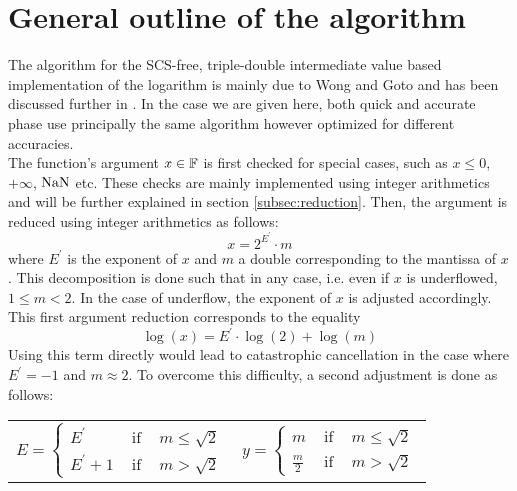 
\section{General outline of the algorithm\label{sec:outline}}
The algorithm for the SCS-free, triple-double intermediate value based implementation of the logarithm is mainly due to 
Wong and Goto\cite{WG94} and has been discussed further in \cite{Muller97}. In the case we are given here,
both quick and accurate phase use principally the same algorithm however optimized for different accuracies.\\
The function's argument $x \in \mathbb {F}$ is first checked for special cases, such as $x\leq0$, $+\infty$, $\mathrm{NaN}$ etc.
These checks are mainly implemented using integer arithmetics and will be further explained in section
\ref{subsec:reduction}. Then, the argument is reduced using integer arithmetics as follows:
$$x = 2^{E^\prime} \cdot m$$
where $E^\prime$ is the exponent of $x$ and $m$ a double corresponding to the mantissa of $x$. This 
decomposition is done such that in any case, i.e. even if $x$ is underflowed, $1 \leq m < 2$. In the case
of underflow, the exponent of $x$ is adjusted accordingly.
This first argument reduction corresponds to the equality
$$\log\left( x \right) = E^\prime \cdot \log\left(2\right) + \log\left(m \right)$$
Using this term directly would lead to catastrophic cancellation in the case where $E^\prime = -1$ and
$m \approx 2$. To overcome this difficulty, a second adjustment is done as follows:
\begin{center}
  \begin{tabular}{cc}
    \begin{minipage}{50mm}
      $$E = \left \lbrace \begin{array}{lcl} E^\prime & \mbox{ if } & m \leq \sqrt{2} \\
          E^\prime +1 & \mbox{ if } & m > \sqrt{2} \end{array} \right.$$
    \end{minipage}
    &
    \begin{minipage}{50mm}
      $$y = \left \lbrace \begin{array}{lcl} m & \mbox{ if } & m \leq \sqrt{2} \\
          \frac{m}{2} & \mbox{ if } & m > \sqrt{2} \end{array} \right.$$
    \end{minipage}
  \end{tabular}
\end{center} ~ \\
